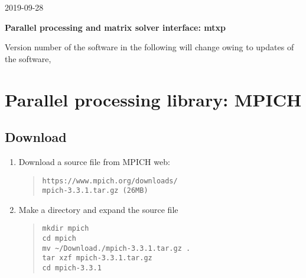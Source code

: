 \documentclass[11pt]{article}
\begin{document}
\begin{flushright}
2019-09-28
\end{flushright}

\begin{center}
{\Large \bf Parallel processing and matrix solver interface: mtxp}
\end{center}

\tableofcontents

\bigskip
\begin{center}
Version number of the software in the following will change owing to
updates of the software, 
\end{center}
\bigskip

\section{Parallel processing library: MPICH}

\subsection{Download}

\begin{enumerate}
\item
Download a source file from MPICH web: 
\begin{quote}
\begin{verbatim}
https://www.mpich.org/downloads/
mpich-3.3.1.tar.gz (26MB)
\end{verbatim}
\end{quote}
\item
Make a directory and expand the source file
\begin{quote}
\begin{verbatim}
mkdir mpich
cd mpich
mv ~/Download./mpich-3.3.1.tar.gz .
tar xzf mpich-3.3.1.tar.gz
cd mpich-3.3.1
\end{verbatim}
\end{quote}
\end{enumerate}
\end{document}

